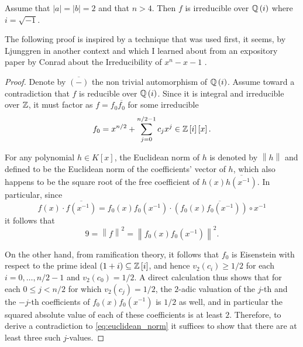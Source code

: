\documentclass[../main.tex]{subfiles}
\begin{document}
\begin{lemma}
  \label{lem:not_embeddable_Qi_if_a2_b2}
  Assume that $\left| a \right| = \left| b \right| = 2$ and that $n > 4$.
  Then $f$ is irreducible over $\mathbb{Q}\left( i \right)$ where $i = \sqrt{-1}$.
\end{lemma}
\begin{remark}
  The following proof is inspired by a technique that was used first, it seems, by Ljunggren \cite{Ljungren1960} in another context and which I learned about from an expository paper by Conrad about the Irreducibility of $x^n - x - 1$ \cite{conradirreducibility}.
\end{remark}
\begin{proof}
  Denote by $\overline{\left( - \right)}$ the non trivial automorphism of $\mathbb{Q}\left( i \right)$.
  Assume toward a contradiction that $f$ is reducible over $\mathbb{Q}\left( i \right)$.
  Since it is integral and irreducible over $\mathbb{Z}$, it must factor as $f = f_0 \overline{f_0}$ for some irreducible 
  \[
    f_0 = x^{n/2} + \sum_{j = 0}^{n/2 - 1} c_j x^j \in \mathbb{Z}\left[ i \right]\left[ x \right]
    .
  \]
  
  For any polynomial $h \in K\left[ x \right]$, the Euclidean norm of $h$ is denoted by $\left\lVert h \right\rVert$ and defined to be the Euclidean norm of the coefficients' vector of $h$, which also happens to be the square root of the free coefficient of $h\left( x \right) \overline{h \left( x^{-1} \right)}$.
  In particular, since 
  \[
    f\left( x \right) \cdot \overline{f \left( x^{-1} \right)} 
    =
    f_0\left( x \right)f_0\left( x^{-1} \right) \cdot 
    \overline{\left( f_0\left( x \right)f_0\left( x^{-1} \right) \right) \circ x^{-1}}
  \]
  it follows that
  \begin{equation}
    \label{eq:euclidean_norm}
    9
    = 
    \left\lVert f \right\rVert^2
    =
    \left\lVert f_0\left( x \right)f_0\left( x^{-1} \right) \right\rVert^2.
  \end{equation}

  On the other hand, from ramification theory, it follows that $f_0$ is Eisenstein with respect to the prime ideal $\left( 1 + i \right) \subseteq \mathbb{Z}\left[ i \right]$, and hence $v_{2}\left( c_i \right) \geq 1/2$ for each $i = 0, \ldots, n / 2 - 1$ and $v_2\left( c_0 \right) = 1/2$.
  A direct calculation thus shows that for each $0 \leq j < n / 2$ for which $v_2\left( c_j \right) = 1/2$, the $2$-adic valuation of the $j$-th and the $-j$-th coefficients of $f_0\left( x \right)f_0\left( x^{-1} \right)$ is $1/2$ as well, and in particular the squared absolute value of each of these coefficients is at least $2$.
  Therefore, to derive a contradiction to \cref{eq:euclidean_norm} it suffices to show that there are at least three such $j$-values. 


\end{proof}
\end{document}
